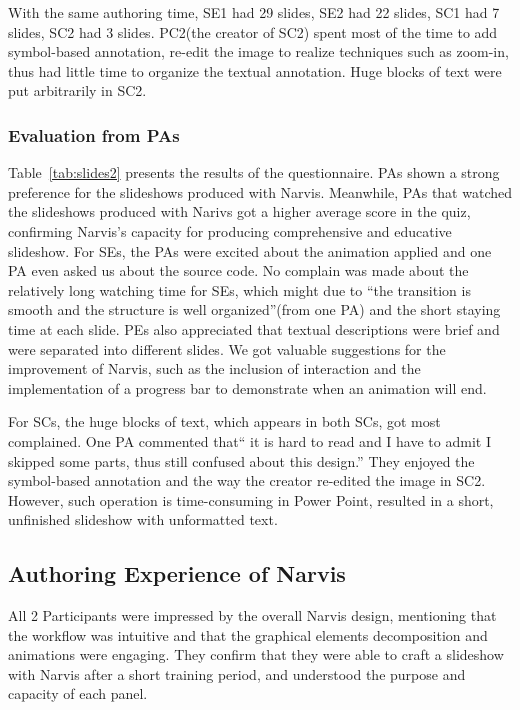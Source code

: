 With the same authoring time, SE1 had 29 slides, SE2 had 22 slides, SC1 had 7 slides, SC2 had 3 slides. PC2(the creator of SC2) spent most of the time to add symbol-based annotation, re-edit the image to realize techniques such as zoom-in, thus had little time to organize the textual annotation. Huge blocks of text were put arbitrarily in SC2.



\subsubsection{Evaluation from PAs}

Table~\ref{tab:slides2} presents the results of the questionnaire. PAs shown a strong preference for the slideshows produced with Narvis. Meanwhile,  PAs that watched the slideshows produced with Narivs got a higher average score in the quiz, confirming Narvis's capacity for producing comprehensive and educative slideshow. 
For SEs, the PAs were excited about the animation applied and one PA even asked us about the source code. No complain was made about the relatively long watching time for SEs, which might due to ``the transition is smooth and the structure is well organized''(from one PA) and the short staying time at each slide. PEs also appreciated that textual descriptions were brief and were separated into different slides.
We got valuable suggestions for the improvement of Narvis, such as the inclusion of interaction and the implementation of a progress bar to demonstrate when an animation will end. 

For SCs, the huge blocks of text, which appears in both SCs, got most complained. 
One PA commented that`` it is hard to read and I have to admit I skipped some parts, thus still confused about this design.'' They enjoyed the symbol-based annotation and the way the creator re-edited the image in SC2. However, such operation is time-consuming in Power Point, resulted in a short, unfinished slideshow with unformatted text. 


\subsection{Authoring Experience of Narvis}
All 2 Participants were impressed by the overall Narvis design, mentioning that the workflow was intuitive and that the graphical elements decomposition and animations were engaging. They confirm that they were able to craft a slideshow with Narvis after a short training period, and understood the purpose and capacity of each panel. 

